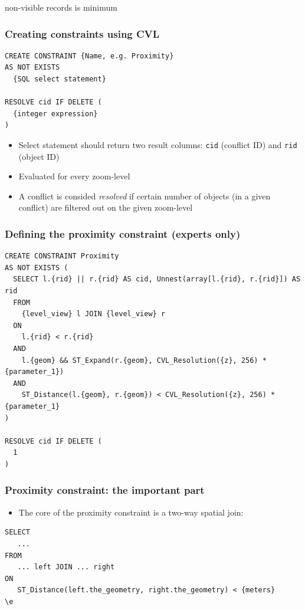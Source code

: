 \documentclass{beamer}
\begin{document}
{\begin{itemize}
non-visible records is minimum
  \end{itemize}
  \begin{center}
  	  
  \end{center}
  
  
}


\begin{frame}[fragile]
\frametitle{Creating constraints using CVL}
\begin{lstlisting}
CREATE CONSTRAINT {Name, e.g. Proximity}
AS NOT EXISTS
  {SQL select statement}
  
RESOLVE cid IF DELETE (
  {integer expression}
)
\end{lstlisting}

\begin{itemize}
\item Select statement should return two result columns: \texttt{cid} (conflict ID) and \texttt{rid} (object ID)
\item Evaluated for every zoom-level
\item A conflict is consided \emph{resolved} if certain number of objects (in a given conflict) are filtered out on the given zoom-level
\end{itemize}

\end{frame}

\begin{frame}[fragile]
\frametitle{Defining the proximity constraint (experts only)}
\begin{lstlisting}
CREATE CONSTRAINT Proximity
AS NOT EXISTS (
  SELECT l.{rid} || r.{rid} AS cid, Unnest(array[l.{rid}, r.{rid}]) AS rid
  FROM
    {level_view} l JOIN {level_view} r
  ON
    l.{rid} < r.{rid}
  AND
    l.{geom} && ST_Expand(r.{geom}, CVL_Resolution({z}, 256) * {parameter_1})
  AND
    ST_Distance(l.{geom}, r.{geom}) < CVL_Resolution({z}, 256) * {parameter_1}
)

RESOLVE cid IF DELETE (
  1
)
\end{lstlisting}
\end{frame}

\begin{frame}[fragile]
\frametitle{Proximity constraint: the important part}
\begin{itemize}
\item The core of the proximity constraint is a two-way spatial join:
\end{itemize}
\begin{lstlisting}
SELECT
   ...
FROM 
   ... left JOIN ... right
ON 
   ST_Distance(left.the_geometry, right.the_geometry) < {meters}
\e
\end{lstlisting}
\end{frame}
\end{document}
